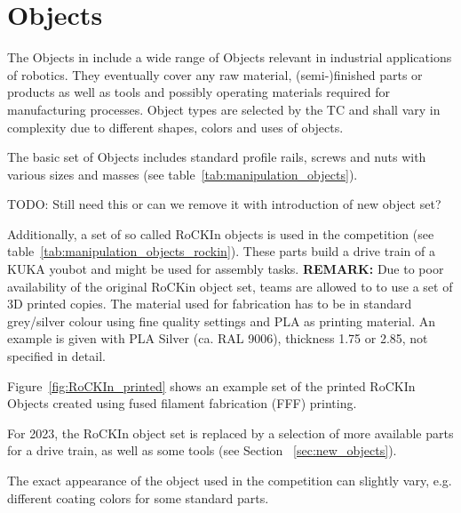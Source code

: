 \clearpage
\section{Objects} 
\label{ssec:ManipulationObjects}

The Objects in \RCAW include a wide range of Objects relevant in industrial applications of robotics. They eventually cover any raw material, (semi-)finished parts or products as well as tools and possibly operating materials required for manufacturing processes. Object types are selected by the TC and shall vary in complexity due to different shapes, colors and uses of objects.
\par 

The basic set of Objects includes standard profile rails, screws and nuts with various sizes and masses (see table~\ref{tab:manipulation_objects}).

TODO: Still need this or can we remove it with introduction of new object set?

Additionally, a set of so called RoCKIn objects is used in the competition (see table~\ref{tab:manipulation_objects_rockin}). 
These parts build a drive train of a KUKA youbot and might be used for assembly tasks.
\textbf{REMARK:} Due to poor availability of the original RoCKin object set, teams are allowed to to use a set of 3D printed copies. The material used for fabrication has to be in standard grey/silver colour using fine quality settings and PLA as printing material. 
An example is given with PLA Silver (ca. RAL 9006), thickness 1.75 or 2.85, not specified in detail.

Figure~\ref{fig:RoCKIn_printed} shows an example set of the printed RoCKIn Objects created using fused filament fabrication (FFF) printing. 



For 2023, the RoCKIn object set is replaced by a selection of more available parts for a drive train, as well as some tools (see Section~
\ref{sec:new_objects}). 

The exact appearance of the object used in the competition can slightly vary, e.g. different coating colors for some standard parts.


